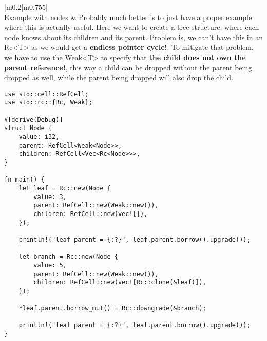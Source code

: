 \documentclass[main.tex,fontsize=8pt,paper=a4,paper=portrait,DIV=calc,]{scrartcl}
\begin{document}
\begin{table}[ht!]
\begin{tabular}{|m{0.2\linewidth}|m{0.755\linewidth}|}
\\
\hline
Example with nodes & 
Probably much better is to just have a proper example where this is actually useful.\newline
Here we want to create a tree structure, where each node knows about its children and its parent. Problem is, we can't have this in an Rc<T> as we would get a \textbf{endless pointer cycle!}.\newline
To mitigate that problem, we have to use the Weak<T> to specify that \textbf{the child does not own the parent reference!}, this way a child can be dropped without the parent being dropped as well, while the parent being dropped will also drop the child.\newline
\begin{lstlisting}
use std::cell::RefCell;
use std::rc::{Rc, Weak};

#[derive(Debug)]
struct Node {
    value: i32,
    parent: RefCell<Weak<Node>>,
    children: RefCell<Vec<Rc<Node>>>,
}

fn main() {
    let leaf = Rc::new(Node {
        value: 3,
        parent: RefCell::new(Weak::new()),
        children: RefCell::new(vec![]),
    });

    println!("leaf parent = {:?}", leaf.parent.borrow().upgrade());

    let branch = Rc::new(Node {
        value: 5,
        parent: RefCell::new(Weak::new()),
        children: RefCell::new(vec![Rc::clone(&leaf)]),
    });

    *leaf.parent.borrow_mut() = Rc::downgrade(&branch);

    println!("leaf parent = {:?}", leaf.parent.borrow().upgrade());
}
\end{lstlisting}\\
\hline
\end{tabular}
\end{table}
\pagebreak
\end{document}
